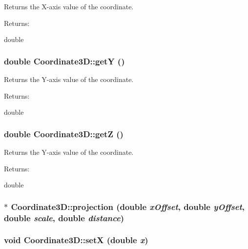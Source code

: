 Returns the X-axis value of the coordinate. \begin{Desc}
\item[Returns: ]\par
double \end{Desc}
\subsubsection{\setlength{\rightskip}{0pt plus 5cm}double Coordinate3D::get\-Y ()\hspace{0.3cm}{\tt  [inline]}}\label{classCoordinate3D_a7}


Returns the Y-axis value of the coordinate. \begin{Desc}
\item[Returns: ]\par
double \end{Desc}
\subsubsection{\setlength{\rightskip}{0pt plus 5cm}double Coordinate3D::get\-Z ()\hspace{0.3cm}{\tt  [inline]}}\label{classCoordinate3D_a8}


Returns the Y-axis value of the coordinate. \begin{Desc}
\item[Returns: ]\par
double \end{Desc}
\subsubsection{ $\ast$ Coordinate3D::projection (double {\em x\-Offset}, double {\em y\-Offset}, double {\em scale}, double {\em distance})}\label{classCoordinate3D_a10}


\subsubsection{\setlength{\rightskip}{0pt plus 5cm}void Coordinate3D::set\-X (double {\em x})\hspace{0.3cm}{\tt  [inline]}}\label{classCoordinate3D_a3}


